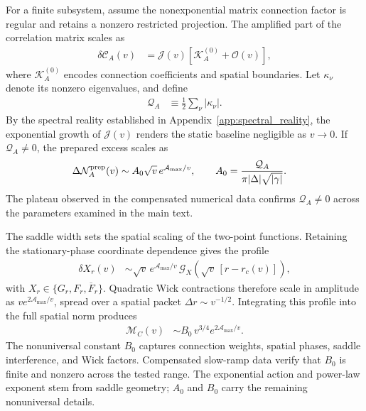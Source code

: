 \documentclass[aps,prb,reprint,superscriptaddress,amsmath,amssymb,floatfix]{revtex4-2}
\begin{document}
  For a finite subsystem, assume the nonexponential matrix connection factor is regular and retains a nonzero restricted projection. The amplified part of the correlation matrix scales as
\begin{equation}
\begin{aligned}
\delta\mathcal C_A(v) &= \mathcal J(v) \left[ \mathcal K_A^{(0)} + \mathcal O(v) \right],
\end{aligned} \label{eq:app_CA_uniform_saddle}
\end{equation}
where $\mathcal K_A^{(0)}$ encodes connection coefficients and spatial boundaries. Let $\kappa_\nu$ denote its nonzero eigenvalues, and define
\begin{equation}
\begin{aligned}
\mathcal Q_A &\equiv \frac{1}{2} \sum_\nu |\kappa_\nu|.
\end{aligned} \label{eq:app_QA}
\end{equation}
By the spectral reality established in Appendix~\ref{app:spectral_reality}, the exponential growth of $\mathcal J(v)$ renders the static baseline negligible as $v\to0$. If $\mathcal Q_A\neq0$, the prepared excess scales as
\begin{equation}
\begin{aligned}
\Delta\mathcal N_A^{\rm prep}(v) &\sim A_0\sqrt v\, e^{\mathcal A_{\max}/v}, \qquad A_0 = \frac{\mathcal Q_A} {\pi|\Delta|\sqrt{|\gamma|}} .
\end{aligned} \label{eq:app_A0_explicit}
\end{equation}
The plateau observed in the compensated numerical data confirms $\mathcal Q_A\neq0$ across the parameters examined in the main text.

The saddle width sets the spatial scaling of the two-point functions. Retaining the stationary-phase coordinate dependence gives the profile
\begin{equation}
\begin{aligned}
\delta X_r(v) &\sim \sqrt v\, e^{\mathcal A_{\max}/v} \, \mathcal G_X\!\left( \sqrt v\,[r-r_c(v)] \right), \end{aligned} \label{eq:app_uniform_contraction}
\end{equation}
with $X_r\in\{G_r,F_r,\overline F_r\}$. Quadratic Wick contractions therefore scale in amplitude as $v e^{2\mathcal A_{\max}/v}$, spread over a spatial packet $\Delta r\sim v^{-1/2}$. Integrating this profile into the full spatial norm produces
\begin{equation}
\begin{aligned}
\mathcal M_C(v) &\sim B_0\,v^{3/4} e^{2\mathcal A_{\max}/v}.
\end{aligned} \label{eq:app_B0_explicit}
\end{equation}
The nonuniversal constant $B_0$ captures connection weights, spatial phases, saddle interference, and Wick factors. Compensated slow-ramp data verify that $B_0$ is finite and nonzero across the tested range. The exponential action and power-law exponent stem from saddle geometry; $A_0$ and $B_0$ carry the remaining nonuniversal details.
\end{document}
